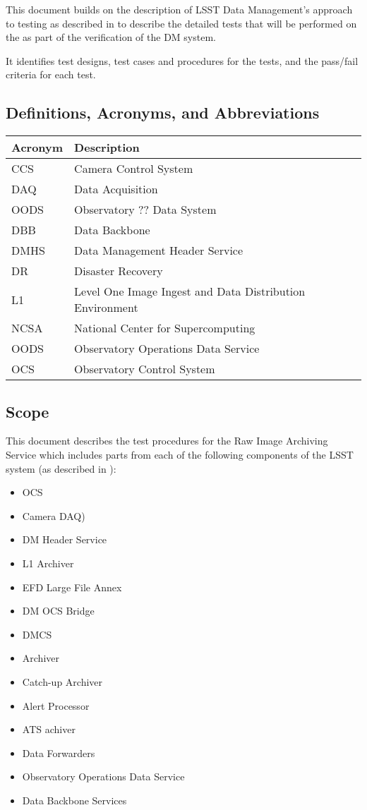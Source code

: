\documentclass[DM,lsstdraft,STS,toc]{lsstdoc}
\begin{document}
This document builds on the description of LSST Data Management's
approach to testing as described in  to describe
the detailed tests that will be performed on the \product{} as part
of the verification of the DM system.


It identifies test designs, test cases and procedures for the tests,
and the pass/fail criteria for each test.

\subsection{Definitions, Acronyms, and Abbreviations \label{sect:acronyms}}
\addtocounter{table}{-1}
\begin{longtable}{|l|p{}|}\hline
\textbf{Acronym} & \textbf{Description} \\\hline
CCS&Camera Control System \\\hline
DAQ&Data Acquisition\\\hline
OODS&Observatory ?? Data System\\\hline
DBB&Data Backbone \\\hline
DMHS&Data Management Header Service \\\hline
DR&Disaster Recovery \\\hline
L1&Level One Image Ingest and Data Distribution Environment \\\hline
NCSA&National Center for Supercomputing \\\hline
OODS&Observatory Operations Data Service \\\hline
OCS&Observatory Control System \\\hline
\end{longtable}


\subsection{Scope}
\label{sec:scope}


This document describes the test procedures for the Raw Image Archiving Service
which includes parts from each of the following components of the LSST system
(as described in ):


\begin{itemize}

\item{OCS}
\item{Camera DAQ)}
\item{DM Header Service}
\item{L1 Archiver}
\item{EFD Large File Annex} 
\item{DM OCS Bridge}
\item{DMCS}
\item{Archiver} 
\item{Catch-up Archiver} 
\item{Alert Processor} 
\item{ATS achiver} 
\item {Data Forwarders}
\item{Observatory Operations Data Service}
\item{Data Backbone Services}


\end{itemize}
\end{document}
